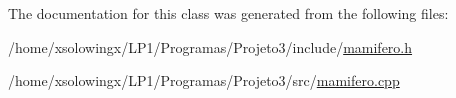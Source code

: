 The documentation for this class was generated from the following files\+:\begin{DoxyCompactItemize}
\item 
/home/xsolowingx/\+L\+P1/\+Programas/\+Projeto3/include/\hyperlink{mamifero_8h}{mamifero.\+h}\item 
/home/xsolowingx/\+L\+P1/\+Programas/\+Projeto3/src/\hyperlink{mamifero_8cpp}{mamifero.\+cpp}\end{DoxyCompactItemize}
